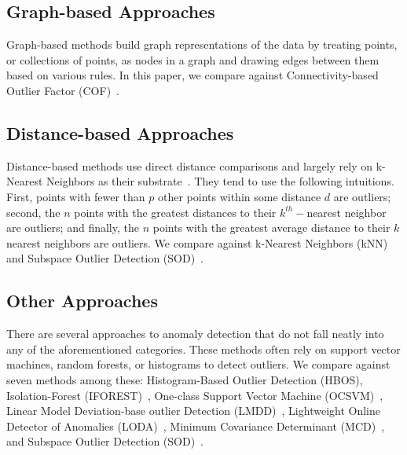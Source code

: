 \subsection{Graph-based Approaches}
\label{subsec:introduction:graph-based-approaches}

Graph-based methods build graph representations of the data by treating points, or collections of points, as nodes in a graph and drawing edges between them based on various rules.
In this paper, we compare against Connectivity-based Outlier Factor (COF)~\cite{tang2002cof}.


\subsection{Distance-based Approaches}
\label{subsec:related-works:distance-based-approaches}

Distance-based methods use direct distance comparisons and largely rely on k-Nearest Neighbors as their substrate~\cite{wang2019progress}.
They tend to use the following intuitions.
First, points with fewer than $p$ other points within some distance $d$ are outliers;
second, the $n$ points with the greatest distances to their $k^{th}-$nearest neighbor are outliers;
and finally, the $n$ points with the greatest average distance to their $k$ nearest neighbors are outliers.
We compare against
k-Nearest Neighbors (kNN)~\cite{ramaswamy2000efficient, sridhar2000knn, fabrizio2002knn} and
Subspace Outlier Detection (SOD)~\cite{kriegel2009sod}.


\subsection{Other Approaches}
\label{subsec:introduction:other-appraoches}

There are several approaches to anomaly detection that do not fall neatly into any of the aforementioned categories.
These methods often rely on support vector machines, random forests, or histograms to detect outliers.
We compare against seven methods among these:
Histogram-Based Outlier Detection (HBOS)\cite{goldstein2012histogram},
Isolation-Forest (IFOREST)~\cite{tony2008iforest,tony2012iforest},
One-class Support Vector Machine (OCSVM)~\cite{sholkopf2001ocsvm},
Linear Model Deviation-base outlier Detection (LMDD)~\cite{arning1996linear},
Lightweight Online Detector of Anomalies (LODA)~\cite{pevny2016loda},
Minimum Covariance Determinant (MCD)~\cite{rousseeuw1999mcd,hardin2004mcd}, and
Subspace Outlier Detection (SOD)~\cite{kriegel2009sod}.

